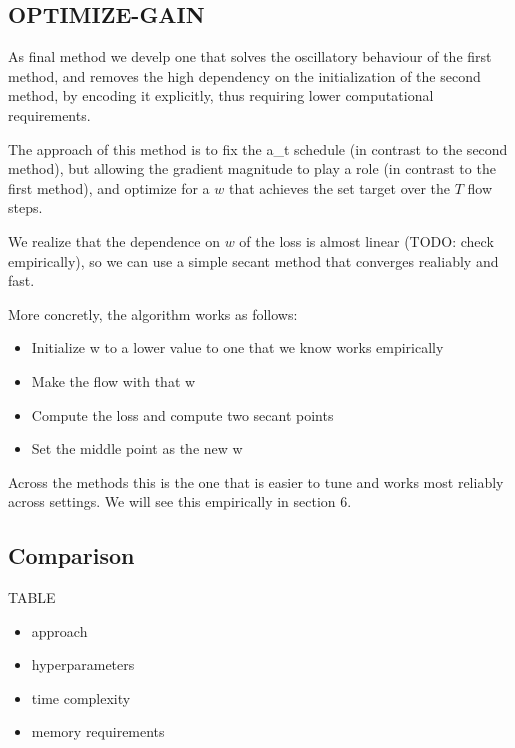 \subsection{OPTIMIZE-GAIN}

As final method we develp one that solves the oscillatory behaviour of the first method, and removes the high dependency on the initialization of the second method, by encoding it explicitly, thus requiring lower computational requirements.

The approach of this method is to fix the a\_t schedule (in contrast to the second method), but allowing the gradient magnitude to play a role (in contrast to the first method),
and optimize for a $w$ that achieves the set target over the $T$ flow steps.

We realize that the dependence on $w$ of the loss is almost linear (TODO: check empirically), so we can use a simple secant method that converges realiably and fast.

More concretly, the algorithm works as follows:
\begin{itemize}[noitemsep]
    \item Initialize w to a lower value to one that we know works empirically
    \item Make the flow with that w
    \item Compute the loss and compute two secant points
    \item Set the middle point as the new w
\end{itemize}

Across the methods this is the one that is easier to tune and works most reliably across settings.
We will see this empirically in section 6.

\subsection{Comparison}

TABLE

\begin{itemize}[noitemsep]
    \item approach
    \item hyperparameters
    \item time complexity
    \item memory requirements
\end{itemize}